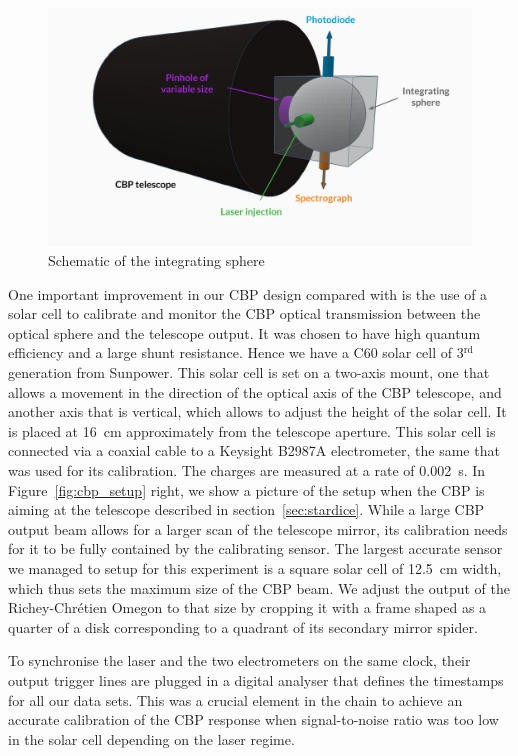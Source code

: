 \begin{figure}
    \centering
    \includegraphics[width=1\columnwidth]{fig/integrating_sphere_3d.pdf}
    \caption{Schematic of the integrating sphere}
    \label{fig:sphere}
\end{figure}


One important improvement in our CBP design compared with \cite{Mondrik_2023} is the use of a solar cell to calibrate and monitor the CBP optical transmission between the optical sphere and the telescope output. It was chosen to have high quantum efficiency and a large shunt resistance. Hence we have a C60 solar cell of 3$^{\mathrm{rd}}$ generation from Sunpower. This solar cell is set on a two-axis mount, one that allows a movement in the direction of the optical axis of the CBP telescope, and another axis that is vertical, which allows to adjust the height of the solar cell. It is placed at \SI{16}{\cm} approximately from the telescope aperture. This solar cell is connected via a coaxial cable to a Keysight B2987A electrometer, the same that was used for its calibration. The charges are measured at a rate of \SI{0.002}{\second}. In Figure~\ref{fig:cbp_setup} right, we show a picture of the setup when the CBP is aiming at the \SD telescope described in section~\ref{sec:stardice}. While a large CBP output beam allows for a larger scan of the telescope mirror, its calibration needs for it to be fully contained by the calibrating sensor. The largest accurate sensor we managed to setup for this experiment is a square solar cell of \SI{12.5}{\centi\meter} width, which thus sets the maximum size of the CBP beam. We adjust the output of the Richey-Chrétien Omegon to that size by cropping it with a frame shaped as a quarter of a disk corresponding to a quadrant of its secondary mirror spider. 

To synchronise the laser and the two electrometers on the same clock, their output trigger lines are plugged in a digital analyser that defines the timestamps for all our data sets. This was a crucial element in the chain to achieve an accurate calibration of the CBP response when signal-to-noise ratio was too low in the solar cell depending on the laser regime.

